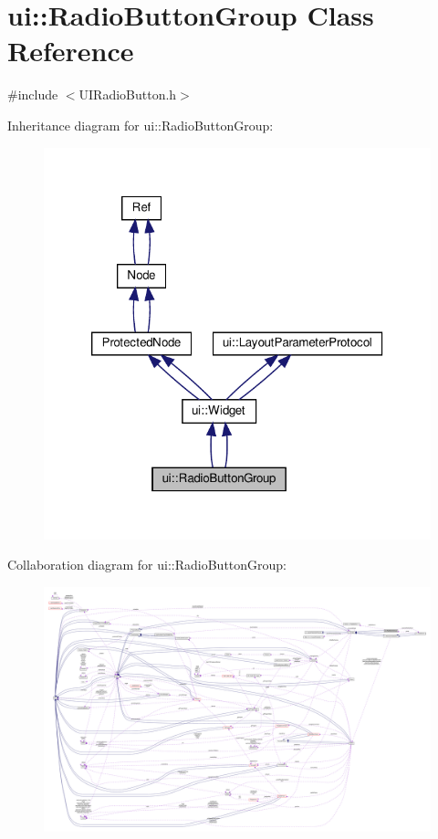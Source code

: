 \hypertarget{classui_1_1RadioButtonGroup}{}\section{ui\+:\+:Radio\+Button\+Group Class Reference}
\label{classui_1_1RadioButtonGroup}


{\ttfamily \#include $<$U\+I\+Radio\+Button.\+h$>$}



Inheritance diagram for ui\+:\+:Radio\+Button\+Group\+:
\nopagebreak
\begin{figure}[H]
\begin{center}
\leavevmode
\includegraphics[width=320pt]{classui_1_1RadioButtonGroup__inherit__graph}
\end{center}
\end{figure}


Collaboration diagram for ui\+:\+:Radio\+Button\+Group\+:
\nopagebreak
\begin{figure}[H]
\begin{center}
\leavevmode
\includegraphics[width=350pt]{classui_1_1RadioButtonGroup__coll__graph}
\end{center}
\end{figure}
